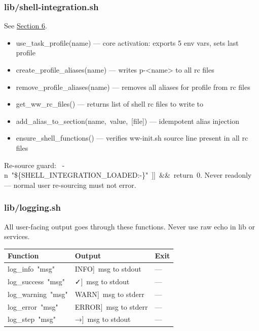 \documentclass[11pt, a4paper, DIV=14]{scrartcl}
\renewcommand{\texttt}[1]{{\ttfamily\fontsize{8.5}{10.5}\selectfont\color{BabbNavy}#1}}
\begin{document}
\subsubsection{lib/shell-integration.sh}\label{libshell-integration.sh}

See \hyperref[6-shell-bootstrap]{Section 6}.

\begin{itemize}
\tightlist
\item
  \texttt{use\_task\_profile(name)} --- core activation: exports 5 env
  vars, sets last profile
\item
  \texttt{create\_profile\_aliases(name)} --- writes
  \texttt{p-\textless{}name\textgreater{}} to all rc files
\item
  \texttt{remove\_profile\_aliases(name)} --- removes all aliases for
  profile from rc files
\item
  \texttt{get\_ww\_rc\_files()} --- returns list of shell rc files to
  write to
\item
  \texttt{add\_alias\_to\_section(name,\ value,\ {[}file{]})} ---
  idempotent alias injection
\item
  \texttt{ensure\_shell\_functions()} --- verifies \texttt{ww-init.sh}
  source line present in all rc files
\end{itemize}

Re-source guard:
\texttt{{[}{[}\ -n\ "\$\{SHELL\_INTEGRATION\_LOADED:-\}"\ {]}{]}\ \&\&\ return\ 0}.
Never \texttt{readonly} --- normal user re-sourcing must not error.

\subsubsection{lib/logging.sh}\label{liblogging.sh}

All user-facing output goes through these functions. Never use raw
\texttt{echo} in lib or services.

{\def\LTcaptype{none} %
\begin{longtable}[]{@{}lll@{}}
\toprule\noalign{}
Function & Output & Exit \\
\midrule\noalign{}
\endhead
\bottomrule\noalign{}
\endlastfoot
\texttt{log\_info\ "msg"} & \texttt{{[}INFO{]}\ msg} to stdout & --- \\
\texttt{log\_success\ "msg"} & \texttt{{[}✓{]}\ msg} to stdout & --- \\
\texttt{log\_warning\ "msg"} & \texttt{{[}WARN{]}\ msg} to stderr &
--- \\
\texttt{log\_error\ "msg"} & \texttt{{[}ERROR{]}\ msg} to stderr &
--- \\
\texttt{log\_step\ "msg"} & \texttt{{[}→{]}\ msg} to stdout & --- \\
\end{longtable}
}
\end{document}
